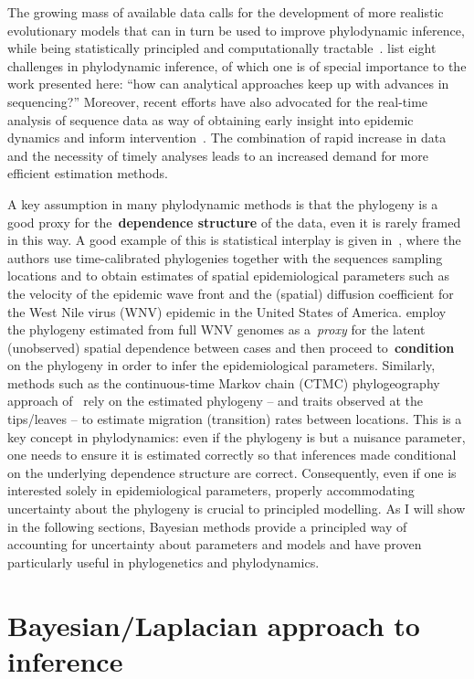 The growing mass of available data calls for the development of more realistic evolutionary models that can in turn be used to improve phylodynamic inference, while being statistically principled and computationally tractable~\citep{Pybus2013}.
\cite{Frost2015} list eight challenges in phylodynamic inference, of which one is of special importance to the work presented here: ``how can analytical approaches keep up with advances in sequencing?''
Moreover, recent efforts have also advocated for the real-time analysis of sequence data as way of obtaining early insight into epidemic dynamics and inform intervention~\citep{Quick2016,Dudas2017,Hadfield2017}.
The combination of rapid increase in data and the necessity of timely analyses leads to an increased demand for more efficient estimation methods.

A key assumption in many phylodynamic methods is that the phylogeny is a good proxy for the~\textbf{dependence structure} of the data, even it is rarely framed in this way.
A good example of this is statistical interplay is given in~\cite{Pybus2012}, where the authors use time-calibrated phylogenies together with the sequences sampling locations and  to obtain estimates of spatial epidemiological parameters such as the velocity of the epidemic wave front and the (spatial) diffusion coefficient for the West Nile virus (WNV) epidemic in the United States of America.
\cite{Pybus2012} employ the phylogeny estimated from full WNV genomes as a~\textit{proxy} for the latent (unobserved) spatial dependence between cases and then proceed to~\textbf{condition} on the phylogeny in order to infer the epidemiological parameters.
Similarly, methods such as the continuous-time Markov chain (CTMC) phylogeography approach of~\cite{Lemey2009} rely on the estimated phylogeny -- and traits observed at the tips/leaves -- to estimate migration (transition) rates between locations.
This is a key concept in phylodynamics: even if the phylogeny is but a nuisance parameter, one needs to ensure it is estimated correctly so that inferences made conditional on the underlying dependence structure are correct.
Consequently, even if one is interested solely in epidemiological parameters, properly accommodating uncertainty about the phylogeny is crucial to principled modelling.
As I will show in the following sections, Bayesian methods provide a principled way of accounting for uncertainty about parameters and models and have proven particularly useful in phylogenetics and phylodynamics.


\section{Bayesian/Laplacian approach to inference}
\label{sec:bayesian_inference}

